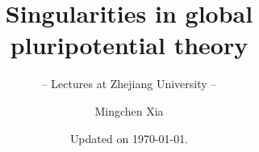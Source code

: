 \documentclass[envcountsect]{svmono}
\begin{document}
\author{Mingchen Xia}
\title{Singularities in global pluripotential theory}
\subtitle{-- Lectures at Zhejiang University --}
\date{Updated on \today.}
\maketitle








\frontmatter%





%
%


\renewcommand{\motto}[2][]{}

\tableofcontents




\mainmatter%
























\appendix




\backmatter%
%
%
\printindex






\end{document}
